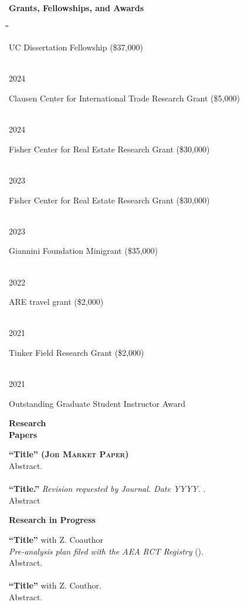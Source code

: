 \documentclass[10pt, oneside]{article}
\makeatletter
\newlength\tdima
\newcommand\tabfill[1]{%
      \setlength\tdima{\linewidth}%
      \addtolength\tdima{\@totalleftmargin}%
      \addtolength\tdima{-\dimen\@curtab}%
      \parbox[t]{\tdima}{#1\ifhmode\strut\fi}}
\newcommand\mytabs{\hspace*{1cm}\=\hspace{1cm}\=\hspace{1cm}\=\hspace{1cm}\=\hspace{1cm}\=\hspace{1cm}\=\hspace{1cm}\=\hspace{1cm}\=\hspace{1cm}\=\hspace{1cm}}
\newenvironment{mysec}[1][\mytabs]
  {\begin{tabbing}#1\kill\ignorespaces}
  {\end{tabbing}}
\makeatother
\begin{document}
\begin{minipage}[t]{0.1\linewidth}
\textbf{Grants, Fellowships, and Awards}
\end{minipage}\hspace{0.05\linewidth}
\begin{minipage}[t]{0.8\linewidth}
\begin{mysec} 
	2025 \>\>\tabfill{UC Dissertation Fellowship (\$37,000)} \\
    2024 \>\>\tabfill{Clausen Center for International Trade Research Grant (\$5,000)} \\
    2024 \>\>\tabfill{Fisher Center for Real Estate Research Grant  (\$30,000)} \\
	2023 \>\>\tabfill{Fisher Center for Real Estate Research Grant  (\$30,000)} \\
    2023 \>\>\tabfill{Giannini Foundation Minigrant  (\$35,000)} \\
    2022 \>\>\tabfill{ARE travel grant  (\$2,000)} \\
    2021 \>\>\tabfill{Tinker Field Research Grant (\$2,000)}\\ 
    2021 \>\>\tabfill{Outstanding Graduate Student Instructor Award}
\end{mysec} 
\end{minipage}\vspace{5mm}

\begin{minipage}[t]{0.1\linewidth}
\textbf{Research \\ Papers}
\end{minipage}\hspace{0.05\linewidth}
\begin{minipage}[t]{0.8\linewidth}
\textbf{``Title'' (\textsc{Job Market Paper})} \\
Abstract.\\~\\
\textbf{``Title.''} \emph{Revision requested by \emph{Journal}. Date YYYY.} \href{address}{\color{blue}{text}}. \\
Abstract
\end{minipage}\vspace{5mm}


\begin{minipage}[t]{0.1\linewidth}
\textbf{Research in Progress}
\end{minipage}\hspace{0.05\linewidth}
\begin{minipage}[t]{0.8\linewidth}
\textbf{``Title''} with Z. Coauthor \\ 
\emph{Pre-analysis plan filed with the AEA RCT Registry} (\href{link}{\color{blue}{\#AEARCTR-ZZZZZZZ}}). \\
Abstract. \\~\\
\textbf{``Title''} with Z. Couthor. \\
Abstract. \\~\\
\end{minipage}\vspace{5mm} 
\end{document}
